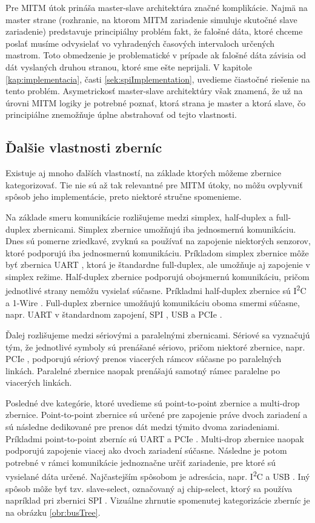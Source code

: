Pre MITM útok prináša master-slave architektúra značné komplikácie. Najmä na master strane (rozhranie, na ktorom MITM zariadenie simuluje skutočné slave zariadenie) predstavuje principiálny problém fakt, že falošné dáta, ktoré chceme poslať musíme odvysielať vo vyhradených časových intervaloch určených mastrom. Toto obmedzenie je problematické v prípade ak falošné dáta závisia od dát vyslaných druhou stranou, ktoré sme ešte neprijali. V kapitole \ref{kap:implementacia}, časti \ref{sek:spiImplementation}, uvedieme čiastočné riešenie na tento problém. Asymetrickosť master-slave architektúry však znamená, že už na úrovni MITM logiky je potrebné poznať, ktorá strana je master a ktorá slave, čo principiálne znemožňuje úplne abstrahovať od tejto vlastnosti.

\subsection{Ďalšie vlastnosti zberníc}
Existuje aj mnoho ďalších vlastností, na základe ktorých môžeme zbernice kategorizovať. Tie nie sú až tak relevantné pre MITM útoky, no môžu ovplyvniť spôsob jeho implementácie, preto niektoré stručne spomenieme.

Na základe smeru komunikácie rozlišujeme medzi simplex, half-duplex a full-duplex zbernicami. Simplex zbernice umožňujú iba jednosmernú komunikáciu. Dnes sú pomerne zriedkavé, zvyknú sa používať na zapojenie niektorých senzorov, ktoré podporujú iba jednosmernú komunikáciu. Príkladom simplex zbernice môže byť zbernica UART \cite{uartBus}, ktorá je štandardne full-duplex, ale umožňuje aj zapojenie v simplex režime. Half-duplex zbernice podporujú obojsmernú komunikáciu, pričom jednotlivé strany nemôžu vysielať súčasne. Príkladmi half-duplex zbernice sú I\textsuperscript{2}C \cite{i2cSpec} a 1-Wire \cite{1wireBus}. Full-duplex zbernice umožňujú komunikáciu oboma smermi súčasne, napr. UART \cite{uartBus} v štandardnom zapojení, SPI \cite{spiBus}, USB \cite{usbSpec} a PCIe \cite{pcieSpec}.

Ďalej rozlišujeme medzi sériovými a paralelnými zbernicami. Sériové sa vyznačujú tým, že jednotlivé symboly sú prenášané sériovo, pričom niektoré zbernice, napr. PCIe \cite{pcieSpec}, podporujú sériový prenos viacerých rámcov súčasne po paralelných linkách. Paralelné zbernice naopak prenášajú samotný rámec paralelne po viacerých linkách.

Posledné dve kategórie, ktoré uvedieme sú point-to-point zbernice a multi-drop zbernice. Point-to-point zbernice sú určené pre zapojenie práve dvoch zariadení a sú následne dedikované pre prenos dát medzi týmito dvoma zariadeniami. Príkladmi point-to-point zberníc sú UART \cite{uartBus} a PCIe \cite{pcieSpec}. Multi-drop zbernice naopak podporujú zapojenie viacej ako dvoch zariadení súčasne. Následne je potom potrebné v rámci komunikácie jednoznačne určiť zariadenie, pre ktoré sú vysielané dáta určené. Najčastejším spôsobom je adresácia, napr. I\textsuperscript{2}C \cite{i2cSpec} a USB \cite{usbSpec}. Iný spôsob môže byť tzv. slave-select, označovaný aj chip-select, ktorý sa používa napríklad pri zbernici SPI \cite{spiBus}. Vizuálne zhrnutie spomenutej kategorizácie zberníc je na obrázku \ref{obr:busTree}.

